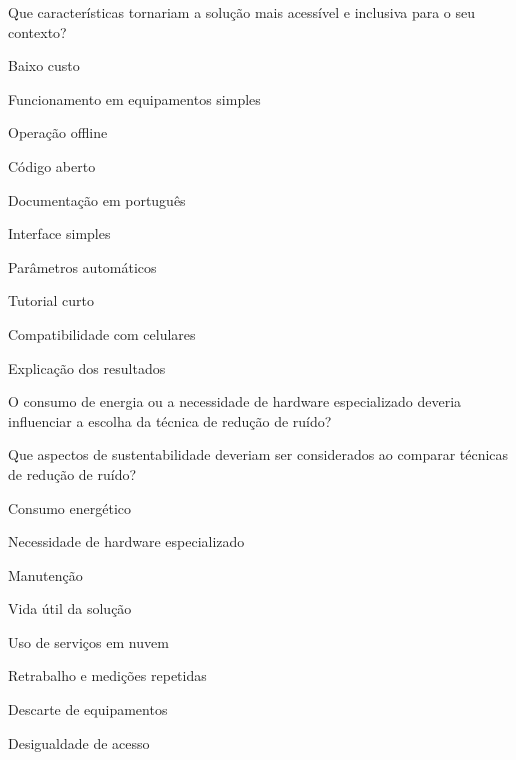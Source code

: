 \begin{perguntaFormulario}{Que características tornariam a solução mais acessível e inclusiva para o seu contexto?}
\begin{opcoesFormularioDuasColunas}
    \item Baixo custo
    \item Funcionamento em equipamentos simples
    \item Operação offline
    \item Código aberto
    \item Documentação em português
    \item Interface simples
    \item Parâmetros automáticos
    \item Tutorial curto
    \item Compatibilidade com celulares
    \item Explicação dos resultados
\end{opcoesFormularioDuasColunas}
\end{perguntaFormulario}

\newpage


\begin{perguntaFormulario}{O consumo de energia ou a necessidade de hardware especializado deveria influenciar a escolha da técnica de redução de ruído?}
\end{perguntaFormulario}

\begin{perguntaFormulario}{Que aspectos de sustentabilidade deveriam ser considerados ao comparar técnicas de redução de ruído?}
\begin{opcoesFormularioDuasColunas}
    \item Consumo energético
    \item Necessidade de hardware especializado
    \item Manutenção
    \item Vida útil da solução
    \item Uso de serviços em nuvem
    \item Retrabalho e medições repetidas
    \item Descarte de equipamentos
    \item Desigualdade de acesso
\end{opcoesFormularioDuasColunas}
\end{perguntaFormulario}

